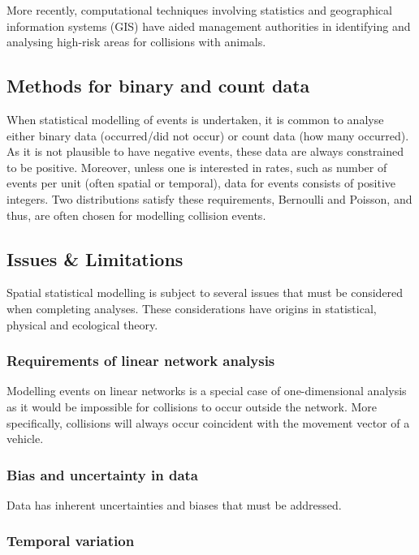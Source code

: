 More recently, computational techniques involving statistics and geographical information systems (GIS) have aided management authorities in identifying and analysing high-risk areas for collisions with animals.

\subsection{Methods for binary and count data}

When statistical modelling of events is undertaken, it is common to analyse either binary data (occurred/did not occur) or count data (how many occurred).  As it is not plausible to have negative events, these data are always constrained to be positive.  Moreover, unless one is interested in rates, such as number of events per unit (often spatial or temporal), data for events consists of positive integers.  Two distributions satisfy these requirements, Bernoulli and Poisson, and thus, are often chosen for modelling collision events.

\subsection{Issues \& Limitations}

Spatial statistical modelling is subject to several issues that must be considered when completing analyses.  These considerations have origins in statistical, physical and ecological theory.

\subsubsection{Requirements of linear network analysis}

Modelling events on linear networks is a special case of one-dimensional analysis as it would be impossible for collisions to occur outside the network.  More specifically, collisions will always occur coincident with the movement vector of a vehicle.

\subsubsection{Bias and uncertainty in data}

Data has inherent uncertainties and biases that must be addressed. 

\subsubsection{Temporal variation}

